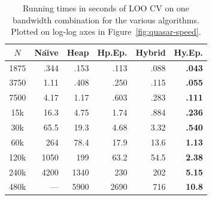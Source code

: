 \documentclass[twoside,leqno,twocolumn]{article}
\begin{document}
\vspace{40pt}
\begin{table}[h]
  \begin{center}\footnotesize\begin{tabular}{|c|r|r|r|r|r|}
    \hline
    \hline
    $N$ & Na\"{\i}ve & Heap & Hp.Ep. & Hybrid & \bf Hy.Ep. \\
    \hline
    \hline
    1875 & .344 & .153 & .113 & .088 & \bf .043 \\
    3750 & 1.11 & .408 & .250 & .115 & \bf .055 \\
    7500 & 4.17 & 1.17 & .603 & .283 & \bf .111 \\
    15k  & 16.3 & 4.75 & 1.74 & .884 & \bf .236 \\
    30k  & 65.5 & 19.3 & 4.68 & 3.32 & \bf .540 \\
    60k  &  264 & 78.4 & 17.9 & 13.6 & \bf 1.13 \\
    120k & 1050 &  199 & 63.2 & 54.5 & \bf 2.38 \\
    240k & 4200 & 1340 &  230 &  202 & \bf 5.15 \\
    480k &  --- & 5900 & 2690 &  716 & \bf 10.8 \\
    \hline
    \hline
  \end{tabular}\end{center}
  \caption{\footnotesize Running times in seconds of LOO CV on one
    bandwidth combination for the various algorithms.  Plotted on
    log-log axes in Figure~\ref{fig:quasar-speed}.}
\end{table}

\newpage



\end{document}
